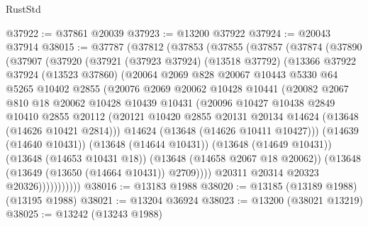 \begin{lexlean}{RustStd}
\begin{coremodule}
@37922 := @37861 @20039
@37923 := @13200 @37922
@37924 := @20043 @37914
@38015 := @37787
    (@37812
      (@37853
        (@37855
          (@37857
            (@37874
              (@37890
                (@37907
                  (@37920
                    (@37921
                      (@37923 @37924)
                      (@13518 @37792)
                      (@13366
                        @37922
                        @37924
                        (@13523 @37860)
                        (@20064
                          @2069
                          @828
                          @20067
                          @10443
                          @5330
                          @64
                          @5265
                          @10402
                          @2855
                          (@20076
                            @2069
                            @20062
                            @10428
                            @10441
                            (@20082
                              @2067
                              @810
                              @18
                              @20062
                              @10428
                              @10439
                              @10431
                              (@20096
                                @10427
                                @10438
                                @2849
                                @10410
                                @2855
                                @20112
                                (@20121
                                  @10420
                                  @2855
                                  @20131
                                  @20134
                                  @14624
                                  (@13648 (@14626 @10421 @2814)))
                                @14624
                                (@13648 (@14626 @10411 @10427)))
                              (@14639 (@14640 @10431))
                              (@13648 (@14644 @10431))
                              (@13648 (@14649 @10431))
                              (@13648 (@14653 @10431 @18))
                              (@13648 (@14658 @2067 @18 @20062))
                              (@13648 (@13649 (@13650 (@14664 @10431)) @2709))))
                          @20311
                          @20314
                          @20323
                          @20326)))))))))))
@38016 := @13183 @1988
@38020 := @13185 (@13189 @1988) (@13195 @1988)
@38021 := @13204 @36924
@38023 := @13200 (@38021 @13219)
@38025 := @13242 (@13243 @1988)

\end{coremodule}
\end{lexlean}
